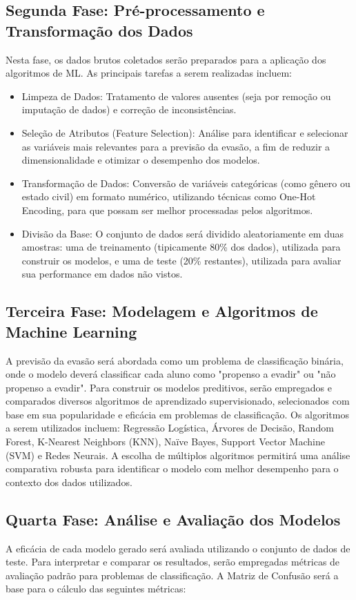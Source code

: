 \documentclass[english, spanish, brazilian]{RBIEarticle} %
\begin{document}
\subsection{Segunda Fase: Pré-processamento e Transformação dos Dados}
Nesta fase, os dados brutos coletados serão preparados para a aplicação dos algoritmos de ML. As principais tarefas a serem realizadas incluem:
\begin{itemize}
  \item Limpeza de Dados: Tratamento de valores ausentes (seja por remoção ou imputação de dados) e correção de inconsistências.
  \item Seleção de Atributos (Feature Selection): Análise para identificar e selecionar as variáveis mais relevantes para a previsão da evasão, a fim de reduzir a dimensionalidade e otimizar o desempenho dos modelos.
  \item Transformação de Dados: Conversão de variáveis categóricas (como gênero ou estado civil) em formato numérico, utilizando técnicas como One-Hot Encoding, para que possam ser melhor processadas pelos algoritmos.
  \item Divisão da Base: O conjunto de dados será dividido aleatoriamente em duas amostras: uma de treinamento (tipicamente 80\% dos dados), utilizada para construir os modelos, e uma de teste (20\% restantes), utilizada para avaliar sua performance em dados não vistos.
\end{itemize}

\subsection{Terceira Fase: Modelagem e Algoritmos de Machine Learning}
A previsão da evasão será abordada como um problema de classificação binária, onde o modelo deverá classificar cada aluno como "propenso a evadir" ou "não propenso a evadir". Para construir os modelos preditivos, serão empregados e comparados diversos algoritmos de aprendizado supervisionado, selecionados com base em sua popularidade e eficácia em problemas de classificação. 
Os algoritmos a serem utilizados incluem: Regressão Logística, Árvores de Decisão, Random Forest, K-Nearest Neighbors (KNN), Naïve Bayes, Support Vector Machine (SVM) e Redes Neurais. A escolha de múltiplos algoritmos permitirá uma análise comparativa robusta para identificar o modelo com melhor desempenho para o contexto dos dados utilizados.

\subsection{Quarta Fase: Análise e Avaliação dos Modelos}
A eficácia de cada modelo gerado será avaliada utilizando o conjunto de dados de teste. Para interpretar e comparar os resultados, serão empregadas métricas de avaliação padrão para problemas de classificação. A Matriz de Confusão será a base para o cálculo das seguintes métricas:
\end{document}
